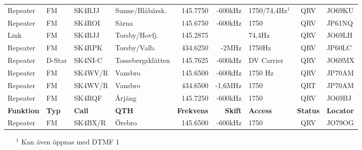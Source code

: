 \documentclass[10pt,swedish,a4paper,twoside]{article}
\begin{document}
\begin{landscape}
\begin{longtable}{llllrrlcl}
	Repeater          & FM           & SK4RJJ        & Sunne/Blåbärsk.     &          145.7750 &        -600kHz & 1750/74,4Hz$^1$ &       QRV       & JO69KU           \\
	Repeater          & FM           & SK4ROI        & Särna               &          145.6750 &        -600kHz & 1750            &       QRV       & JP61NQ           \\
	Link              & FM           & SK4RJJ        & Torsby/Hovfj.       &          145.2875 &                & 74,4Hz          &       QRV       & JO69LH           \\
	Repeater          & FM           & SK4RPK        & Torsby/Valb.        &          434.6250 &          -2MHz & 1750Hz          &       QRV       & JP60LC           \\
	Repeater          & D-Star       & SK4NI-C       & Tossebergsklätten   &          145.7625 &        -600kHz & DV Carrier      &       QRV       & JO69MX           \\
	Repeater          & FM           & SK4WV/R       & Vansbro             &          145.6500 &        -600kHz & 1750 Hz         &       QRV       & JP70AM           \\
	Repeater          & FM           & SK4WV/R       & Vansbro             &          434.6500 &        -1,6MHz & 1750            &       QRT       & JP70AM           \\
	Repeater          & FM           & SK4RQF        & Årjäng              &          145.7250 &        -600kHz & 1750            &       QRV       & JO69BJ           \\
	\textbf{Funktion} & \textbf{Typ} & \textbf{Call} & \textbf{QTH}        & \textbf{Frekvens} & \textbf{Skift} & \textbf{Access} & \textbf{Status} & \textbf{Locator} \\ \hline
	Repeater          & FM           & SK4BX/R       & Örebro              &          145.6500 &        -600kHz & 1750            &       QRV       & JO79OG
\end{longtable}
\begin{itemize}
\item[$^1$] Kan även öppnas med DTMF 1
\end{itemize}

\end{landscape}
\end{document}

